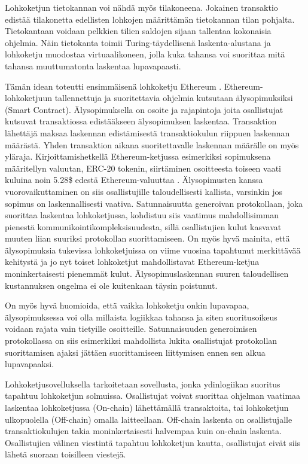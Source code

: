 Lohkoketjun tietokannan voi nähdä myös tilakoneena. Jokainen transaktio edistää tilakonetta edellisten lohkojen määrittämän tietokannan tilan pohjalta. Tietokantaan voidaan pelkkien tilien saldojen sijaan tallentaa kokonaisia ohjelmia. Näin tietokanta toimii Turing-täydellisenä laskenta-alustana ja lohkoketju muodostaa virtuaalikoneen, jolla kuka tahansa voi suorittaa mitä tahansa muuttumatonta laskentaa lupavapaasti.

Tämän idean toteutti ensimmäisenä lohkoketju Ethereum \cite{buterin_ethereum_2014}. Ethereum-lohkoketjuun tallennettuja ja suoritettavia ohjelmia kutsutaan älysopimuksiksi (Smart Contract). Älysopimuksella on osoite ja rajapintoja joita osallistujat kutsuvat transaktiossa edistääkseen älysopimuksen laskentaa. Transaktion lähettäjä maksaa laskennan edistämisestä transaktiokulun riippuen laskennan määrästä. Yhden transaktion aikana suoritettavalle laskennan määrälle on myös yläraja. Kirjoittamishetkellä Ethereum-ketjussa esimerkiksi sopimuksena määritellyn valuutan, ERC-20 tokenin, siirtäminen osoitteesta toiseen vaati kuluina noin 5.28\$ edestä Ethereum-valuuttaa \cite{etherscanio_ethereum_nodate}. Älysopimusten kanssa vuorovaikuttaminen on siis osallistujille taloudellisesti kallista, varsinkin jos sopimus on laskennallisesti vaativa. Satunnaisuutta generoivan protokollaan, joka suorittaa laskentaa lohkoketjussa, kohdistuu siis vaatimus mahdollisimman pienestä kommunikointikompleksisuudesta, sillä osallistujien kulut kasvavat muuten liian suuriksi protokollan suorittamiseen. On myös hyvä mainita, että älysopimuksia tukevissa lohkoketjuissa on viime vuosina tapahtunut merkittävää kehitystä ja jo nyt toiset lohkoketjut mahdollistavat Ethereum-ketjua moninkertaisesti pienemmät kulut. Älysopimuslaskennan suuren taloudellisen kustannuksen ongelma ei ole kuitenkaan täysin poistunut. 

On myös hyvä huomioida, että vaikka lohkoketju onkin lupavapaa, älysopimuksessa voi olla millaista logiikkaa tahansa ja siten suoritusoikeus voidaan rajata vain tietyille osoitteille. Satunnaisuuden generoimisen protokollassa on siis esimerkiksi mahdollista lukita osallistujat protokollan suorittamisen ajaksi jättäen suorittamiseen liittymisen ennen sen alkua lupavapaaksi.

Lohkoketjusovelluksella tarkoitetaan sovellusta, jonka ydinlogiikan suoritus tapahtuu lohkoketjun solmuissa. Osallistujat voivat suorittaa ohjelman vaatimaa laskentaa lohkoketjussa (On-chain) lähettämällä transaktoita, tai lohkoketjun ulkopuolella (Off-chain) omalla laitteellaan. Off-chain laskenta on osallistujalle transaktiokulujen takia moninkertaisesti halvempaa kuin on-chain laskenta. Osallistujien välinen viestintä tapahtuu lohkoketjun kautta, osallistujat eivät siis lähetä suoraan toisilleen viestejä.

